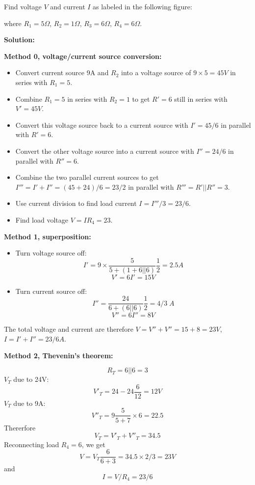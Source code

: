 \begin{enumerate}
  Find voltage $V$ and current $I$ as labeled in the following figure:


  where $R_1=5\Omega$, $R_2=1\Omega$, $R_3=6\Omega$, $R_4=6\Omega$.

  {\bf Solution:}

  {\bf Method 0, voltage/current source conversion:}
  \begin{itemize}
  \item Convert current source 9A and $R_2$ into a voltage source of $9\times 5=45V$
    in series with $R_1=5$. 
  \item Combine $R_1=5$ in series with $R_2=1$ to get $R'=6$ still in series with 
    $V'=45V$. 
  \item Convert this voltage source back to a current source with $I'=45/6$ in 
    parallel with $R'=6$. 
  \item Convert the other voltage source into a current source with $I''=24/6$ in
    parallel with $R''=6$.
  \item Combine the two parallel current sources to get $I'''=I'+I''=(45+24)/6=23/2$
    in parallel with $R'''=R'||R''=3$.
  \item Use current division to find load current $I=I'''/3=23/6$.
  \item Find load voltage $V=IR_4=23$.
  \end{itemize}

  {\bf Method 1, superposition:}
    \begin{itemize}
    \item Turn voltage source off:
      \[ I'=9\times\frac{5}{5+(1+6||6)}\frac{1}{2}=2.5A \]
      \[ V'=6I'=15 V \]
    \item Turn current source off:
      \[ I''=\frac{24}{6+(6||6)}\frac{1}{2}=4/3\;A \]
      \[ V''=6I''=8V \]
  \end{itemize}
  The total voltage and current are therefore $V=V''+V''=15+8=23V$,
  $I=I'+I''=23/6A$.

  {\bf Method 2, Thevenin's theorem:}
  
  \[ R_T=6||6=3 \]
  $V_T$ due to 24V:
  \[ V'_T=24-24 \frac{6}{12}=12V \]
  $V_T$ due to 9A:
  \[ V''_T=9\frac{5}{5+7}\times 6=22.5 \]
  Thererfore
  \[ V_T=V'_T+V''_T=34.5 \]
  Reconnecting load $R_4=6$, we get
  \[ V=V_T \frac{6}{6+3}=34.5\times 2/3=23 V \]
  and
  \[ I=V/R_4=23/6 \]


\end{enumerate}



